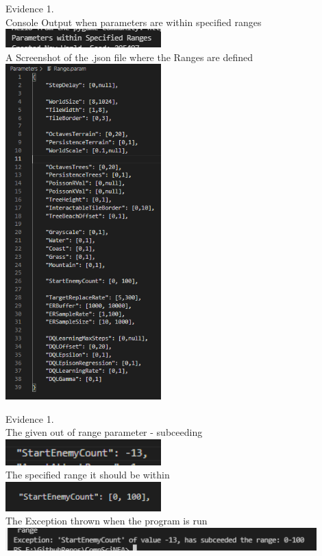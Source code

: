 \begin{center}
    {\large Evidence 1.\rn } \\ 
    \vspace{0.3cm}
    Console Output when parameters are within specified ranges \\
    \includegraphics[width=6cm]{Images/Testing/T1.2.1.PNG} \\
    A Screenshot of the .json file where the Ranges are defined \\
    \includegraphics[width=6cm]{Images/Testing/T1.2.2.PNG}
    \vspace{1cm}

    {\large Evidence 1.\rn } \\ 
    \vspace{0.3cm}
    The given out of range parameter - subceeding \\
    \includegraphics[width=6cm]{Images/Testing/T1.3.1.PNG} \\
    The specified range it should be within \\
    \includegraphics[width=6cm]{Images/Testing/T1.3.2.PNG} \\
    The Exception thrown when the program is run \\
    \includegraphics[width=12cm]{Images/Testing/T1.3.3.PNG} \\
    \vspace{1cm}


\end{center}

